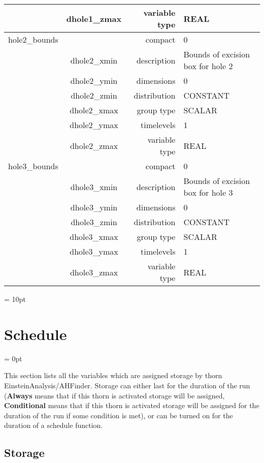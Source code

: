 \begin{tabular*}{150mm}{|c|c@{\extracolsep{\fill}}|rl|}
 & dhole1\_zmax & variable type & REAL \\ 
\hline 
hole2\_bounds &  & compact & 0 \\ 
 & dhole2\_xmin & description & Bounds of excision box for hole 2 \\ 
 & dhole2\_ymin & dimensions & 0 \\ 
 & dhole2\_zmin & distribution & CONSTANT \\ 
 & dhole2\_xmax & group type & SCALAR \\ 
 & dhole2\_ymax & timelevels & 1 \\ 
 & dhole2\_zmax & variable type & REAL \\ 
\hline 
hole3\_bounds &  & compact & 0 \\ 
 & dhole3\_xmin & description & Bounds of excision box for hole 3 \\ 
 & dhole3\_ymin & dimensions & 0 \\ 
 & dhole3\_zmin & distribution & CONSTANT \\ 
 & dhole3\_xmax & group type & SCALAR \\ 
 & dhole3\_ymax & timelevels & 1 \\ 
 & dhole3\_zmax & variable type & REAL \\ 
\hline 
\end{tabular*} 



\vspace{5mm}\parskip = 10pt 

\section{Schedule} 


\parskip = 0pt


\noindent This section lists all the variables which are assigned storage by thorn EinsteinAnalysis/AHFinder.  Storage can either last for the duration of the run ({\bf Always} means that if this thorn is activated storage will be assigned, {\bf Conditional} means that if this thorn is activated storage will be assigned for the duration of the run if some condition is met), or can be turned on for the duration of a schedule function.


\subsection*{Storage}

\hspace{5mm}

